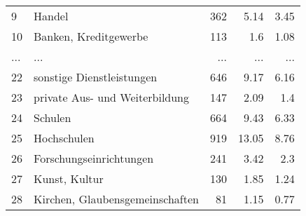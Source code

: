 \begin{longtable}{lXrrr}
        9 & \multicolumn{1}{X}{Handel} & %
          \num{362} &
          \num[round-mode=places,round-precision=2]{5,14} &
          \num[round-mode=places,round-precision=2]{3,45} \\
        10 & \multicolumn{1}{X}{Banken, Kreditgewerbe} & %
          \num{113} &
          \num[round-mode=places,round-precision=2]{1,6} &
          \num[round-mode=places,round-precision=2]{1,08} \\
       ... & ... & ... & ... & ... \\
        22 & \multicolumn{1}{X}{sonstige Dienstleistungen} & %
          \num{646} &
          \num[round-mode=places,round-precision=2]{9,17} &
          \num[round-mode=places,round-precision=2]{6,16} \\

        23 & \multicolumn{1}{X}{private Aus- und Weiterbildung} & %
          \num{147} &
          \num[round-mode=places,round-precision=2]{2,09} &
          \num[round-mode=places,round-precision=2]{1,4} \\

        24 & \multicolumn{1}{X}{Schulen} & %
          \num{664} &
          \num[round-mode=places,round-precision=2]{9,43} &
          \num[round-mode=places,round-precision=2]{6,33} \\

        25 & \multicolumn{1}{X}{Hochschulen} & %
          \num{919} &
          \num[round-mode=places,round-precision=2]{13,05} &
          \num[round-mode=places,round-precision=2]{8,76} \\

        26 & \multicolumn{1}{X}{Forschungseinrichtungen} & %
          \num{241} &
          \num[round-mode=places,round-precision=2]{3,42} &
          \num[round-mode=places,round-precision=2]{2,3} \\

        27 & \multicolumn{1}{X}{Kunst, Kultur} & %
          \num{130} &
          \num[round-mode=places,round-precision=2]{1,85} &
          \num[round-mode=places,round-precision=2]{1,24} \\

        28 & \multicolumn{1}{X}{Kirchen, Glaubensgemeinschaften} & %
          \num{81} &
          \num[round-mode=places,round-precision=2]{1,15} &
          \num[round-mode=places,round-precision=2]{0,77} \\


\end{longtable}
